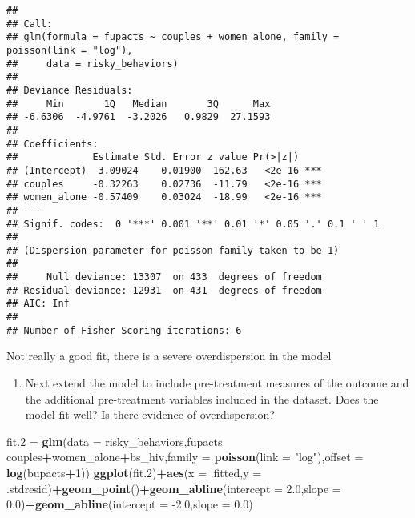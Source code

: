 \documentclass[]{article}
\newenvironment{Shaded}{\begin{snugshade}}{\end{snugshade}}
\newcommand{\DataTypeTok}[1]{\textcolor[rgb]{0.13,0.29,0.53}{#1}}
\newcommand{\DecValTok}[1]{\textcolor[rgb]{0.00,0.00,0.81}{#1}}
\newcommand{\FloatTok}[1]{\textcolor[rgb]{0.00,0.00,0.81}{#1}}
\newcommand{\KeywordTok}[1]{\textcolor[rgb]{0.13,0.29,0.53}{\textbf{#1}}}
\newcommand{\NormalTok}[1]{#1}
\newcommand{\OperatorTok}[1]{\textcolor[rgb]{0.81,0.36,0.00}{\textbf{#1}}}
\newcommand{\StringTok}[1]{\textcolor[rgb]{0.31,0.60,0.02}{#1}}
\providecommand{\tightlist}{%
  \setlength{\itemsep}{0pt}\setlength{\parskip}{0pt}}
\begin{document}
\begin{verbatim}
## 
## Call:
## glm(formula = fupacts ~ couples + women_alone, family = poisson(link = "log"), 
##     data = risky_behaviors)
## 
## Deviance Residuals: 
##     Min       1Q   Median       3Q      Max  
## -6.6306  -4.9761  -3.2026   0.9829  27.1593  
## 
## Coefficients:
##             Estimate Std. Error z value Pr(>|z|)    
## (Intercept)  3.09024    0.01900  162.63   <2e-16 ***
## couples     -0.32263    0.02736  -11.79   <2e-16 ***
## women_alone -0.57409    0.03024  -18.99   <2e-16 ***
## ---
## Signif. codes:  0 '***' 0.001 '**' 0.01 '*' 0.05 '.' 0.1 ' ' 1
## 
## (Dispersion parameter for poisson family taken to be 1)
## 
##     Null deviance: 13307  on 433  degrees of freedom
## Residual deviance: 12931  on 431  degrees of freedom
## AIC: Inf
## 
## Number of Fisher Scoring iterations: 6
\end{verbatim}

Not really a good fit, there is a severe overdispersion in the model

\begin{enumerate}
\def\labelenumi{\arabic{enumi}.}
\setcounter{enumi}{1}
\tightlist
\item
  Next extend the model to include pre-treatment measures of the outcome
  and the additional pre-treatment variables included in the dataset.
  Does the model fit well? Is there evidence of overdispersion?
\end{enumerate}

\begin{Shaded}
\begin{Highlighting}[]
\NormalTok{fit}\FloatTok{.2}\NormalTok{ =}\StringTok{ }\KeywordTok{glm}\NormalTok{(}\DataTypeTok{data =}\NormalTok{ risky_behaviors,fupacts }\OperatorTok{~}\StringTok{ }\NormalTok{couples}\OperatorTok{+}\NormalTok{women_alone}\OperatorTok{+}\NormalTok{bs_hiv,}\DataTypeTok{family =} \KeywordTok{poisson}\NormalTok{(}\DataTypeTok{link =} \StringTok{"log"}\NormalTok{),}\DataTypeTok{offset =} \KeywordTok{log}\NormalTok{(bupacts}\OperatorTok{+}\DecValTok{1}\NormalTok{))}
\KeywordTok{ggplot}\NormalTok{(fit}\FloatTok{.2}\NormalTok{)}\OperatorTok{+}\KeywordTok{aes}\NormalTok{(}\DataTypeTok{x =}\NormalTok{ .fitted,}\DataTypeTok{y =}\NormalTok{ .stdresid)}\OperatorTok{+}\KeywordTok{geom_point}\NormalTok{()}\OperatorTok{+}\KeywordTok{geom_abline}\NormalTok{(}\DataTypeTok{intercept =} \FloatTok{2.0}\NormalTok{,}\DataTypeTok{slope =} \FloatTok{0.0}\NormalTok{)}\OperatorTok{+}\KeywordTok{geom_abline}\NormalTok{(}\DataTypeTok{intercept =} \FloatTok{-2.0}\NormalTok{,}\DataTypeTok{slope =} \FloatTok{0.0}\NormalTok{)}
\end{Highlighting}
\end{Shaded}
\end{document}
